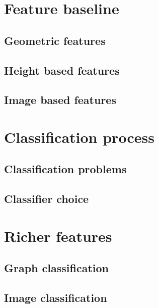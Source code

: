 \minitoc
\section{Feature baseline}
    \subsection{Geometric features}
    \subsection{Height based features}
    \subsection{Image based features}
\section{Classification process}
    \subsection{Classification problems}
    \subsection{Classifier choice}
    \subsection{}
\section{Richer features}
    \subsection{Graph classification}
    \subsection{Image classification}
